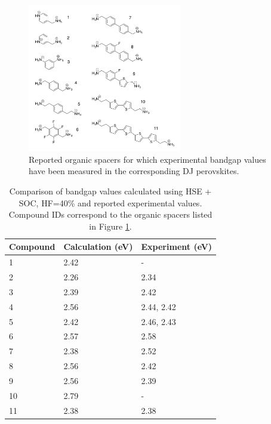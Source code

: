 \begin{enumerate}
\begin{figure}[ht]
    \centering
    \includegraphics[width=0.6\textwidth]{figures/methodology/figure3-12.png}
    \caption{Reported organic spacers for which experimental bandgap values have been measured in the corresponding DJ perovskites.}
    \label{fig:figure3.12}
\end{figure}

\begin{table}[!ht]
    \centering
    \caption[Comparison of bandgap values calculated using HSE + SOC, HF=40\% and reported experimental values.]{Comparison of bandgap values calculated using HSE + SOC, HF=40\% and reported experimental values. Compound IDs correspond to the organic spacers listed in Figure \ref{fig:figure3.12}.}\label{table:table3.1}
    \begin{tabular}{|l|l|l|}
        \hline
        \textbf{Compound} & \textbf{Calculation (eV)} & \textbf{Experiment (eV)} \\  \hline
        1 & 2.42 & -\cite{RN31} \\ \hline
        2 & 2.26 & 2.34\cite{RN31} \\ \hline 
        3 & 2.39 & 2.42\cite{RN33} \\ \hline
        4 & 2.56 & 2.44\cite{RN86}, 2.42\cite{RN34} \\ \hline 
        5 & 2.42 & 2.46\cite{RN86}, 2.43\cite{RN95} \\ \hline 
        6 & 2.57 & 2.58\cite{RN95} \\ \hline
        7 & 2.38 & 2.52\cite{RN84} \\  \hline
        8 & 2.56 & 2.42\cite{RN84} \\  \hline 
        9 & 2.56 & 2.39\cite{RN84} \\  \hline
        10 & 2.79 & -\cite{RN41} \\ \hline 
        11 & 2.38 & 2.38\cite{RN38} \\ \hline 
    \end{tabular}
\end{table}


\end{enumerate}
